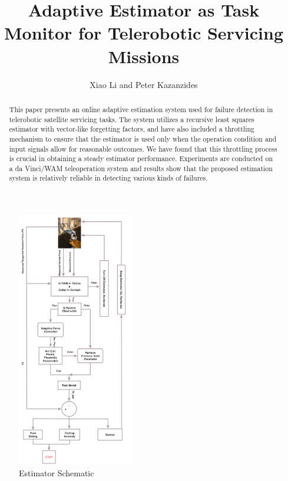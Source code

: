 \documentclass[letterpaper, 10 pt, conference]{ieeeconf}  %
\title{\LARGE \bf
Adaptive Estimator as Task Monitor for Telerobotic Servicing Missions
}
\author{Xiao Li and Peter Kazanzides%
}
\begin{document}
\maketitle
\thispagestyle{empty}
\pagestyle{empty}


\begin{abstract}

This paper presents an online adaptive estimation system used for failure detection in telerobotic satellite servicing tasks. The system utilizes a recursive least squares estimator with vector-like forgetting factors, and have also included a throttling mechanism to ensure that the estimator is used only when the operation condition and input signals allow for reasonable outcomes. We have found that this throttling process is crucial in obtaining a steady estimator performance. Experiments are conducted on a da Vinci/WAM teleoperation system and results show that the proposed estimation system is relatively reliable in detecting various kinds of failures.

\end{abstract}

\begin{figure}[htbp]
\begin{center}
\includegraphics[width=0.45\textwidth]{figures/flowchart.png}
\caption{Estimator Schematic}
\label{fig:1}
\end{center}
\end{figure}
\end{document}
